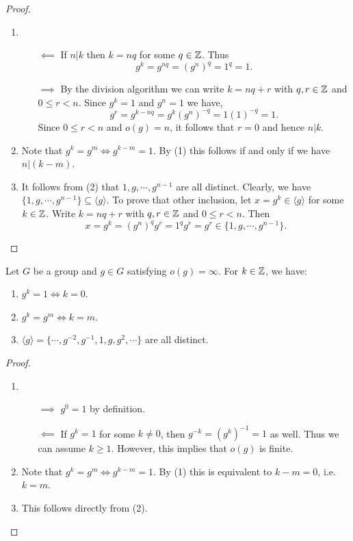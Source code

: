 \documentclass[11pt]{article}
\begin{document}
\begin{proof}\,
\begin{enumerate}
    \item\,
    \begin{itemize}
        \item [$\impliedby$] If $n|k$ then $k=nq$ for some $q\in\mathbb{Z}$. Thus \[g^k=g^{nq}=(g^n)^q=1^q=1.\]
        \item[$\implies$] By the division algorithm we can write $k=nq+r$ with $q,r\in\mathbb{Z}$ and $0\leq r<n$. Since $g^k=1$ and $g^n=1$ we have,
        \[g^r=g^{k-nq}=g^k(g^n)^{-q}=1(1)^{-q}=1.\]
        Since $0\leq r<n$ and $o(g)=n$, it follows that $r=0$ and hence $n|k$.
    \end{itemize}
    \item Note that $g^k=g^m\iff g^{k-m}=1$. By (1) this follows if and only if we have $n|(k-m)$.

    \item It follows from (2) that $1,g,\cdots,g^{n-1}$ are all distinct. Clearly, we have $\{1,g,\cdots,g^{n-1}\}\subseteq\langle g\rangle$. To prove that other inclusion, let $x=g^k\in\langle g\rangle$ for some $k\in\mathbb{Z}$. Write $k=nq+r$ with $q,r\in\mathbb{Z}$ and $0\leq r<n$. Then
    \[x=g^k=(g^n)^qg^r=1^qg^r=g^r\in\{1,g,\cdots,g^{n-1}\}.\]
\end{enumerate}
\end{proof}

\begin{proposition}
    Let $G$ be a group and $g\in G$ satisfying $o(g)=\infty$. For $k\in\mathbb{Z}$, we have:
    \begin{enumerate}
        \item $g^k=1\iff k=0$.
        \item $g^k=g^m\iff k=m$.
        \item $\langle g\rangle=\{\cdots,g^{-2},g^{-1},1,g,g^2,\cdots\}$ are all distinct.
    \end{enumerate}
\end{proposition}

\begin{proof}\,
\begin{enumerate}
    \item\,
    \begin{itemize}
        \item[$\implies$] $g^0=1$ by definition.
        \item[$\impliedby$] If $g^k=1$ for some $k\neq0$, then $g^{-k}=(g^k)^{-1}=1$ as well. Thus we can assume $k\geq1$. However, this implies that $o(g)$ is finite.
    \end{itemize}
    \item Note that $g^k=g^m\iff g^{k-m}=1$. By (1) this is equivalent to $k-m=0$, i.e. $k=m$.
    \item This follows directly from (2).
\end{enumerate}
\end{proof}
\end{document}
